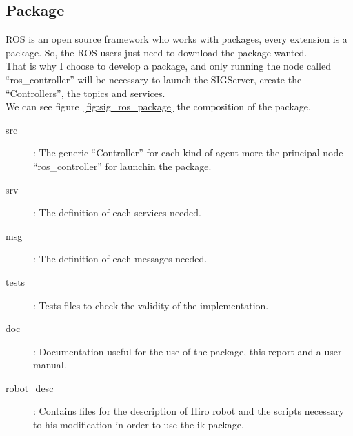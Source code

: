\subsection{Package}
ROS is an open source framework who works with packages, every extension is a package. So, the ROS users just need to download the package wanted.\\
That is why I choose to develop a package, and only running the node called ``ros\_controller'' will be necessary to launch the SIGServer, create the ``Controllers'', the topics and services.\\
We can see figure~\ref{fig:sig_ros_package} the composition of the package.
\begin{description}
	\item[src] : The generic ``Controller'' for each kind of agent more the principal node ``ros\_controller'' for launchin the package.
	\item[srv] : The definition of each services needed.
	\item[msg] : The definition of each messages needed.
	\item[tests] : Tests files to check the validity of the implementation.
	\item[doc] : Documentation useful for the use of the package, this report and a user manual.
	\item[robot\_desc] : Contains files for the description of Hiro robot and the scripts necessary to his modification in order to use the ik package.
\end{description}

\noindent\begin{minipage}{\linewidth}%
\label{fig:sig_ros_package}%
\end{minipage}

